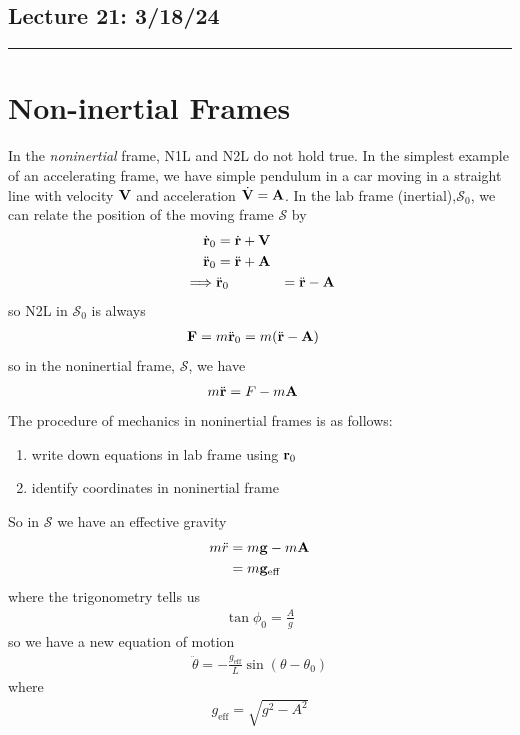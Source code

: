\documentclass[../main.tex]{subfiles}
\begin{document}
\subsection*{Lecture 21: \hfill  3/18/24}
\hrule \vspace{10px}
\section{Non-inertial Frames}
In the \emph{noninertial} frame, N1L and N2L do not hold true. In the simplest example of an
accelerating frame, we have simple pendulum in a car moving in a straight line with velocity $\vb V$ and acceleration
$\dot{\vb V} = \vb A$. In the lab frame (inertial),$\mathcal{S}_0$, we can relate the position of the
moving frame $\mathcal{S}$ by
\begin{align*}
    \dot{\vb r}_0 &= \dot{\vb r} + \vb V \\ 
    \ddot{\vb r}_0 &= \ddot{\vb r} + \vb A \\
    \implies &\ddot{\vb r}_0 &= \ddot{\vb r} - \vb A
\end{align*}
so N2L in $\mathcal{S}_0$ is always
\begin{align*}
    \vb F &= m \ddot{\vb r}_0 = m (\ddot{\vb r} - \vb A)
\end{align*}
so in the noninertial frame, $\mathcal{S}$, we have
\begin{align*}
    m\ddot{\vb r} &= F - m\vb A
\end{align*}
The procedure of mechanics in noninertial frames is as follows:
\begin{enumerate}
    \item write down equations in lab frame using $\vb r_0$
    \item identify coordinates in noninertial frame
\end{enumerate}
So in $\mathcal{S}$ we have an effective gravity
\begin{align*}
    m\ddot{r} &= m\vb g - m \vb A \\
    &= m \vb g_{\text{eff}}
\end{align*}
where the trigonometry tells us
\begin{align*}
    \tan\phi_0 = \frac{A}{g}
\end{align*}
so we have a new equation of motion
\begin{align*}
    \ddot \theta = -\frac{g_{\text{eff}}}{L} \sin(\theta - \theta_0)
\end{align*}
where
\begin{align*}
    g_{\text{eff}} = \sqrt{g^2 - A^2}
\end{align*}
\end{document}
